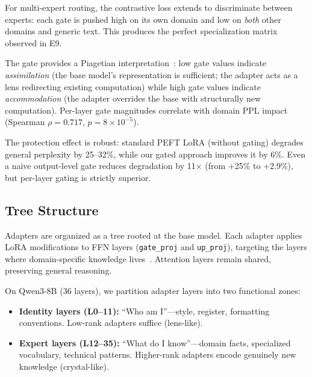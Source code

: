 \documentclass{article}
\begin{document}
For multi-expert routing, the contrastive loss extends to discriminate
between experts: each gate is pushed high on its own domain and low on
\emph{both} other domains and generic text. This produces the perfect
specialization matrix observed in E9.


The gate provides a Piagetian interpretation~\cite{piaget1952}: low gate
values indicate \emph{assimilation} (the base model's representation is
sufficient; the adapter acts as a lens redirecting existing computation)
while high gate values indicate \emph{accommodation} (the adapter
overrides the base with structurally new computation). Per-layer gate
magnitudes correlate with domain PPL impact (Spearman $\rho = 0.717$,
$p = 8 \times 10^{-5}$).

The protection effect is robust: standard PEFT LoRA (without gating)
degrades general perplexity by 25--32\%, while our gated approach
improves it by 6\%. Even a naive output-level gate reduces degradation
by 11$\times$ (from +25\% to +2.9\%), but per-layer gating is strictly
superior.


\subsection{Tree Structure}
\label{sec:tree-structure}

Adapters are organized as a tree rooted at the base model. Each adapter
applies LoRA modifications to FFN layers (\texttt{gate\_proj} and
\texttt{up\_proj}), targeting the layers where domain-specific knowledge
lives~\cite{geva2021transformer}. Attention layers remain shared,
preserving general reasoning.

On Qwen3-8B (36 layers), we partition adapter layers into two functional
zones:
\begin{itemize}[nosep,leftmargin=1.5em]
\item \textbf{Identity layers (L0--11):} ``Who am I''---style, register,
      formatting conventions. Low-rank adapters suffice (lens-like).
\item \textbf{Expert layers (L12--35):} ``What do I know''---domain
      facts, specialized vocabulary, technical patterns. Higher-rank
      adapters encode genuinely new knowledge (crystal-like).
\end{itemize}
\end{document}
